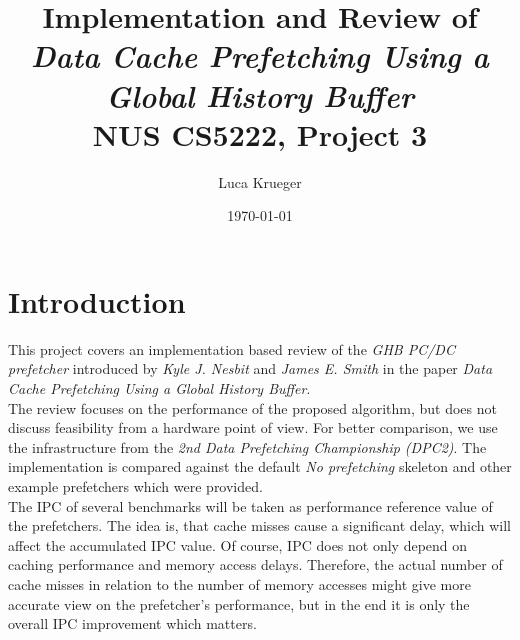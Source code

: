 \documentclass{article}
\title{Implementation and Review of \\ \textit{Data Cache Prefetching Using a Global History Buffer\cite{GHB}} \\ NUS CS5222, Project 3}
\author{Luca Krueger}
\date{\today}
\begin{document}
\maketitle

\section{Introduction}
This project covers an implementation based review of the \textit{GHB PC/DC prefetcher} introduced by \textit{Kyle J. Nesbit} and \textit{James E. Smith} in the paper \textit{Data Cache Prefetching Using a Global History Buffer\cite{GHB}}. \\
The review focuses on the performance of the proposed algorithm, but does not discuss feasibility from a hardware point of view.
For better comparison, we use the infrastructure from the \textit{2nd Data Prefetching Championship (DPC2)}. The implementation is compared against the default \textit{No prefetching} skeleton and other example prefetchers which were provided. \\
The IPC of several benchmarks will be taken as performance reference value of the prefetchers. The idea is, that cache misses cause a significant delay, which will affect the accumulated IPC value. 
Of course, IPC does not only depend on caching performance and memory access delays. Therefore, the actual number of cache misses in relation to the number of memory accesses might give more accurate view on the prefetcher's performance, but in the end it is only the overall IPC improvement which matters. 
\end{document}

